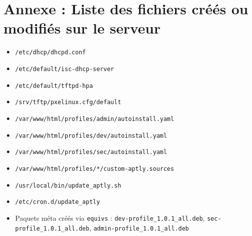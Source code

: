\documentclass[a4paper,12pt]{article}
\begin{document}
\section{Annexe : Liste des fichiers créés ou modifiés sur le serveur}
\begin{itemize}
\item \texttt{/etc/dhcp/dhcpd.conf}
\item \texttt{/etc/default/isc-dhcp-server}
\item \texttt{/etc/default/tftpd-hpa}
\item \texttt{/srv/tftp/pxelinux.cfg/default}
\item \texttt{/var/www/html/profiles/admin/autoinstall.yaml}
\item \texttt{/var/www/html/profiles/dev/autoinstall.yaml}
\item \texttt{/var/www/html/profiles/sec/autoinstall.yaml}
\item \texttt{/var/www/html/profiles/*/custom-aptly.sources}
\item \texttt{/usr/local/bin/update\_aptly.sh}
\item \texttt{/etc/cron.d/update\_aptly}
\item Paquets méta créés via \texttt{equivs} : \texttt{dev-profile\_1.0.1\_all.deb}, \texttt{sec-profile\_1.0.1\_all.deb}, \texttt{admin-profile\_1.0.1\_all.deb}
\end{itemize}
\end{document}
